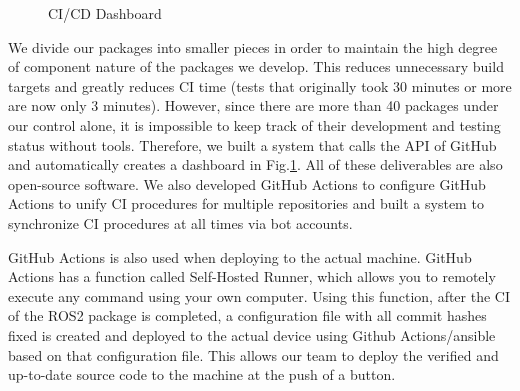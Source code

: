 \documentclass[lettersize,journal]{IEEEtran}
\begin{document}
\begin{figure}[htbp]
    \begin{center}
  \end{center}
  \caption{CI/CD Dashboard}
  \label{fig:ci_cd_dashboard}
\end{figure}

We divide our packages into smaller pieces in order to maintain the high degree of component nature of the packages we develop.
This reduces unnecessary build targets and greatly reduces CI time (tests that originally took 30 minutes or more are now only 3 minutes).
However, since there are more than 40 packages under our control alone,
it is impossible to keep track of their development and testing status without tools.
Therefore, we built a system that calls the API of GitHub and automatically creates a dashboard in Fig.\ref{fig:ci_cd_dashboard}.
All of these deliverables are also open-source software.
We also developed GitHub Actions to configure GitHub Actions to unify CI procedures for multiple repositories and
built a system to synchronize CI procedures at all times via bot accounts. \cite{wam-v-tan_bot}

GitHub Actions is also used when deploying to the actual machine.
GitHub Actions has a function called Self-Hosted Runner, which allows you to remotely execute any command using your own computer.
Using this function, after the CI of the ROS2 package is completed, 
a configuration file with all commit hashes fixed is created and deployed to the actual device
using Github Actions/ansible based on that configuration file.
This allows our team to deploy the verified and up-to-date source code to the machine at the push of a button.
\end{document}

